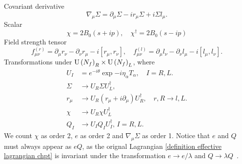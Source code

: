 Covariant derivative
%
\begin{equation}
    \nabla_\mu\Sigma = \partial_\mu \Sigma - ir_\mu \Sigma + i \Sigma l_\mu.
\end{equation}
%
Scalar
%
\begin{equation}
    \chi = 2 B_0 (s + ip), \quad \chi^\dagger = 2 B_0 (s - ip)  
\end{equation}
%
Field strength tensor
%
\begin{equation}
    f_{\mu \nu}^{(r)} = \partial_\mu r_\nu - \partial_\nu r_\mu - i[r_\mu, r_\nu], 
    \quad f_{\mu \nu}^{(l)} = \partial_\mu l_\nu - \partial_\nu l_\mu - i[l_\mu, l_\nu].
\end{equation}
%
Transformations under $\text{U}\left(N_f\right)_R \times \text{U}\left(N_f\right)_L$, where
\begin{align}
    U_I &= e^{-i\theta} \exp{-i \eta_\alpha T_\alpha }, \quad I = R, L. \\
    \Sigma &\rightarrow U_R \Sigma U_L^\dagger, \\
    r_\mu &\rightarrow U_R (r_\mu + i\partial_\mu) U_R^\dagger, \quad 
    r, R \rightarrow l, L. \\
    \chi &\rightarrow U_R \chi U_L^\dagger \\
    Q_I &\rightarrow U_I Q_I U_I^\dagger, \, I = R, L.
\end{align}
%
We count $\chi$ as order 2, $e$ as order 2 and $\nabla_\mu\Sigma$ as order 1.
Notice that $e$ and $Q$ must always appear as $e Q$, as the orignal Lagrangian \autoref{definition effective lagrangian chpt} is invariant under the transformation $e \rightarrow e/\lambda$ and $Q \rightarrow \lambda Q$~\autocite{pencoIntroductionEffectiveField2020}.